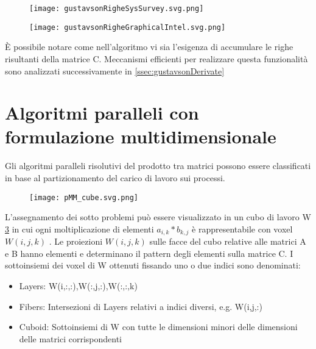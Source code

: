 \begin{figure}[h!]
  \caption[pseudo-codice dell'algoritmo di Gustavson]
  \centering \texttt{[image: gustavsonRigheSysSurvey.svg.png]} \decoRule
  \label{figCode:gustavsonRigheSysSurvey}
\end{figure}
\begin{figure}[h!]
  \caption[rappresentazione grafica di una iterazione dell'algoritmo di Gustavson]
  \centering \texttt{[image: gustavsonRigheGraphicalIntel.svg.png]} \decoRule
  \label{fig:gustavsonRigheGraphicalIntel}
\end{figure}
È possibile notare come nell'algoritmo vi sia l'esigenza di accumulare le righe
risultanti della matrice C. Meccanismi efficienti per realizzare questa
funzionalità sono analizzati successivamente in \ref{ssec:gustavsonDerivate} %
\\


\section{Algoritmi paralleli con formulazione multidimensionale} 
Gli algoritmi paralleli risolutivi del prodotto tra matrici possono essere
classificati in base al partizionamento del carico di lavoro sui processi.\\
\begin{figure}[h!]
  \centering \texttt{[image: pMM\_cube.svg.png]} 
  \caption[Rappresentazione grafica dell'assegnamento dei task per la risoluzione
      di SpMM in 1,2 e 3 dimensioni]\decoRule \label{fig:pMM_cube}
\end{figure}
L'assegnamento dei sotto problemi può essere visualizzato in un cubo di lavoro W \ref{fig:pMM_cube}
in cui ogni moltiplicazione di elementi \nnz $a_{i,k}*b_{k,j}$ è rappresentabile
con voxel $W(i,j,k)$ \cite{cartesianPartitioningModels}.
Le proiezioni $W(i,j,k)$  sulle facce del cubo relative alle matrici A e B 
hanno elementi \nnz e determinano il pattern degli elementi \nnz sulla matrice C.
\label{ChExistingTecqs:workCube}
I sottoinsiemi dei voxel di W ottenuti fissando uno o due indici sono denominati:
\begin{itemize}
  \item Layers: W(i,:,:),W(:,j,:),W(:,:,k)
  \item Fibers: Intersezioni di Layers relativi a indici diversi, e.g. W(i,j,:)
  \item Cuboid: Sottoinsiemi di W con tutte le dimensioni minori delle 
   dimensioni delle matrici corrispondenti
\end{itemize}

